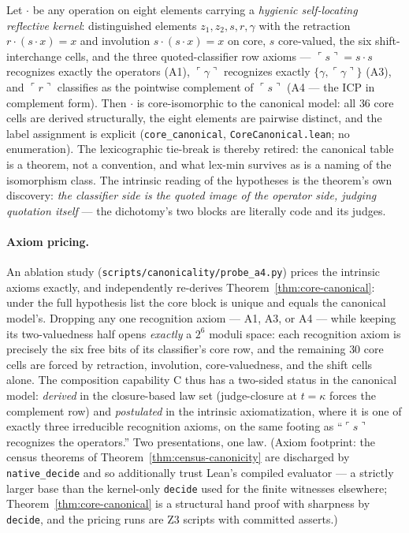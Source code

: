 \documentclass[sigconf,screen]{acmart}
\newcommand{\dotop}{\cdot}
\theoremstyle{remark}
\begin{document}
\begin{theorem}
\label{thm:core-canonical}
Let $\dotop$ be any operation on eight elements carrying a
\emph{hygienic self-locating reflective kernel}: distinguished
elements $z_1, z_2, s, r, \gamma$ with the retraction
$r \dotop (s \dotop x) = x$ and involution
$s \dotop (s \dotop x) = x$ on core, $s$ core-valued, the six
shift-interchange cells, and the three quoted-classifier row axioms
--- $\ulcorner s \urcorner = s \dotop s$ recognizes exactly the
operators (A1), $\ulcorner \gamma \urcorner$ recognizes exactly
$\{\gamma, \ulcorner \gamma \urcorner\}$ (A3), and
$\ulcorner r \urcorner$ classifies as the pointwise complement of
$\ulcorner s \urcorner$ (A4 --- the ICP in complement form). Then
$\dotop$ is core-isomorphic to the canonical model: all $36$ core
cells are derived structurally, the eight elements are pairwise
distinct, and the label assignment is explicit
(\texttt{core\_canonical}, \texttt{CoreCanonical.lean}; no
enumeration). The lexicographic tie-break is thereby retired: the
canonical table is a theorem, not a convention, and what lex-min
survives as is a naming of the isomorphism class. The intrinsic
reading of the hypotheses is the theorem's own discovery: \emph{the
classifier side is the quoted image of the operator side, judging
quotation itself} --- the dichotomy's two blocks are literally code
and its judges.
\end{theorem}

\paragraph{Axiom pricing.} An ablation study
(\texttt{scripts/canonicality/probe\_a4.py}) prices the intrinsic
axioms exactly, and independently re-derives
Theorem~\ref{thm:core-canonical}: under the full hypothesis list the
core block is unique and equals the canonical model's. Dropping any
one recognition axiom --- A1, A3, or A4 --- while keeping its
two-valuedness half opens \emph{exactly} a $2^6$ moduli space: each
recognition axiom is precisely the six free bits of its classifier's
core row, and the remaining $30$ core cells are forced by retraction,
involution, core-valuedness, and the shift cells alone. The
composition capability C thus has a two-sided status in the canonical
model: \emph{derived} in the closure-based law set (judge-closure at
$t = \kappa$ forces the complement row) and \emph{postulated} in the
intrinsic axiomatization, where it is one of exactly three
irreducible recognition axioms, on the same footing as
``$\ulcorner s \urcorner$ recognizes the operators.'' Two
presentations, one law. (Axiom footprint: the census theorems of
Theorem~\ref{thm:census-canonicity} are discharged by
\texttt{native\_decide} and so additionally trust Lean's compiled
evaluator --- a strictly larger base than the kernel-only
\texttt{decide} used for the finite witnesses elsewhere;
Theorem~\ref{thm:core-canonical} is a structural hand proof with
sharpness by \texttt{decide}, and the pricing runs are Z3 scripts
with committed asserts.)
\end{document}
